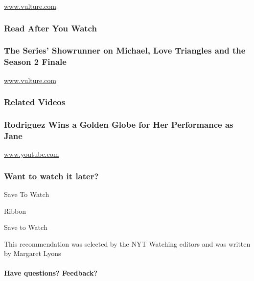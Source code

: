 \href{http://www.vulture.com}{www.vulture.com}

\hypertarget{read-after-you-watch}{%
\subsubsection{Read After You Watch}\label{read-after-you-watch}}

\href{http://www.vulture.com/2016/05/jane-the-virgin-jennie-snyder-urman-season-two-finale.html}{}

\hypertarget{the-series-showrunner-on-michael-love-triangles-and-the-season-2-finale}{%
\subsubsection{The Series' Showrunner on Michael, Love Triangles and the
Season 2
Finale}\label{the-series-showrunner-on-michael-love-triangles-and-the-season-2-finale}}

\href{http://www.vulture.com}{www.vulture.com}

\hypertarget{related-videos}{%
\subsubsection{Related Videos}\label{related-videos}}

\href{https://www.youtube.com/watch?v=veftkYtLVBM}{}

\hypertarget{rodriguez-wins-a-golden-globe-for-her-performance-as-jane}{%
\subsubsection{Rodriguez Wins a Golden Globe for Her Performance as
Jane}\label{rodriguez-wins-a-golden-globe-for-her-performance-as-jane}}

\href{http://www.youtube.com}{www.youtube.com}

\hypertarget{want-to-watch-it-later}{%
\subsubsection{Want to watch it later?}\label{want-to-watch-it-later}}

Save To Watch

Ribbon

Save to Watch

This recommendation was selected by the NYT Watching editors and was
written by Margaret Lyons

\hypertarget{have-questions-feedback}{%
\paragraph{Have questions? Feedback?}\label{have-questions-feedback}}

